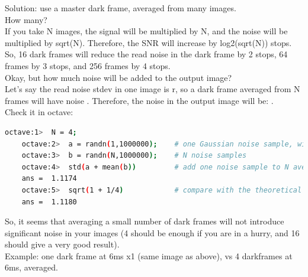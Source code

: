 Solution: use a master dark frame, averaged from many images.\\

How many?\\

If you take N images, the signal will be multiplied by N, and the noise will be multiplied by sqrt(N). Therefore, the SNR will increase by log2(sqrt(N)) stops.\\

So, 16 dark frames will reduce the read noise in the dark frame by 2 stops, 64 frames by 3 stops, and 256 frames by 4 stops.\\

Okay, but how much noise will be added to the output image?\\

Let's say the read noise stdev in one image is r, so a dark frame averaged from N frames will have noise . Therefore, the noise in the output image will be: .\\

Check it in octave:\\ 

\begin{lstlisting}[language=bash,morekeywords=$,keywordstyle=\bfseries,frame=none,xleftmargin=.25in,belowskip=2em, aboveskip=2em]
    octave:1>  N = 4;
    octave:2>  a = randn(1,1000000);    # one Gaussian noise sample, with mean=0 and stdev=1
    octave:3>  b = randn(N,1000000);    # N noise samples
    octave:4>  std(a + mean(b))         # add one noise sample to N averaged noise samples
    ans =  1.1174
    octave:5>  sqrt(1 + 1/4)            # compare with the theoretical result
    ans =  1.1180
\end{lstlisting}

So, it seems that averaging a small number of dark frames will not introduce significant noise in your images (4 should be enough if you are in a hurry, and 16 should give a very good result).\\

Example: one dark frame at 6ms x1 (same image as above), vs 4 darkframes at 6ms, averaged.\\

